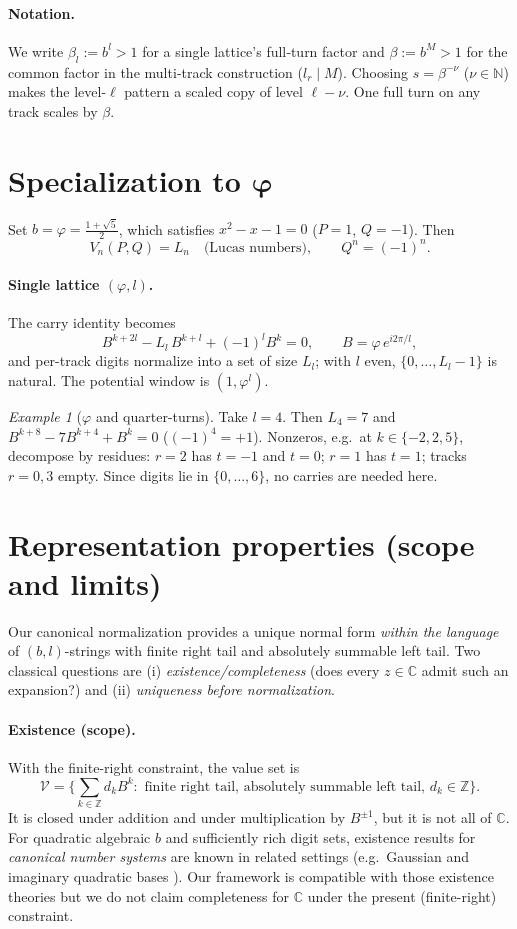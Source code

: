 \documentclass[11pt]{article}
\theoremstyle{definition}
\theoremstyle{remark}
\newtheorem{example}[theorem]{Example}
\newcommand{\Z}{\mathbb{Z}}
\newcommand{\N}{\mathbb{N}}
\newcommand{\C}{\mathbb{C}}
\begin{document}
\paragraph{Notation.}
We write $\beta_l:=b^l>1$ for a single lattice’s full‑turn factor and $\beta:=b^M>1$ for the common factor in the multi‑track construction ($l_r\mid M$). Choosing $s=\beta^{-\nu}$ ($\nu\in\N$) makes the level-$\ell$ pattern a scaled copy of level $\ell-\nu$. One full turn on any track scales by $\beta$.

\section{Specialization to $\boldsymbol\varphi$}\label{sec:phi}
Set $b=\varphi=\tfrac{1+\sqrt5}{2}$, which satisfies $x^2-x-1=0$ ($P=1$, $Q=-1$). Then
\[
V_n(P,Q)=L_n\quad\text{(Lucas numbers)},\qquad Q^{n}=(-1)^n.
\]
\paragraph{Single lattice $(\varphi,l)$.}
The carry identity becomes
\[
B^{k+2l}-L_l\,B^{k+l}+(-1)^l B^k=0,\qquad B=\varphi\,e^{i2\pi/l},
\]
and per-track digits normalize into a set of size $L_l$; with $l$ even, $\{0,\dots,L_l-1\}$ is natural. The potential window is $(1,\varphi^{l})$.

\begin{example}[$\varphi$ and quarter-turns]
Take $l=4$. Then $L_4=7$ and $B^{k+8}-7B^{k+4}+B^k=0$ ($(-1)^4=+1$).
Nonzeros, e.g.\ at $k\in\{-2,2,5\}$, decompose by residues:
$r=2$ has $t=-1$ and $t=0$; $r=1$ has $t=1$; tracks $r=0,3$ empty.
Since digits lie in $\{0,\dots,6\}$, no carries are needed here.
\end{example}

\section{Representation properties (scope and limits)}
Our canonical normalization provides a unique normal form \emph{within the language} of $(b,l)$-strings with finite right tail and absolutely summable left tail. Two classical questions are (i) \emph{existence/completeness} (does every $z\in\C$ admit such an expansion?) and (ii) \emph{uniqueness before normalization}.

\paragraph{Existence (scope).}
With the finite-right constraint, the value set is
\[
\mathcal V=\bigg\{\sum_{k\in\Z} d_k B^k : \text{ finite right tail, absolutely summable left tail, } d_k\in\Z\bigg\}.
\]
It is closed under addition and under multiplication by $B^{\pm1}$, but it is not all of $\C$. For quadratic algebraic $b$ and sufficiently rich digit sets, existence results for \emph{canonical number systems} are known in related settings (e.g.\ Gaussian and imaginary quadratic bases \cite{Penney1965,Gilbert1981,Heuberger2007,AkiyamaPetho2011}). Our framework is compatible with those existence theories but we do not claim completeness for $\C$ under the present (finite-right) constraint.
\end{document}
